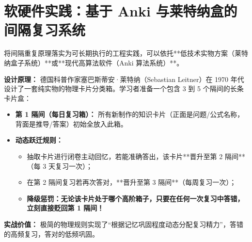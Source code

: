 \documentclass[12pt,a4paper,openany]{ctexbook}
\begin{document}
\section{软硬件实践：基于 Anki 与莱特纳盒的间隔复习系统}

将间隔重复原理落实为可长期执行的工程实践，可以依托**低技术实物方案（莱特纳盒子系统）**或**现代高算法软件（Anki 算法系统）**。

\begin{casebox}
\textbf{设计原理：} 
德国科普作家塞巴斯蒂安·莱特纳（Sebastian Leitner）在 1970 年代设计了一套纯实物的物理卡片分类箱。学习者准备一个包含 3 到 5 个隔间的长条卡片盒：
\begin{itemize}
    \item \textbf{第 1 隔间（每日复习箱）：} 所有新制作的知识卡片（正面是问题/公式名称，背面是推导/答案）初始全放入此箱。
    \item \textbf{动态跃迁规则：}
    \begin{itemize}
        \item 抽取卡片进行闭卷主动回忆，若能准确答出，该卡片**晋升至第 2 隔间**（每 3 天复习一次）；
        \item 在第 2 隔间复习若再次答对，**晋升至第 3 隔间**（每周复习一次）；
        \item \textbf{降级惩罚：无论该卡片处于哪个高阶箱子，只要在任何一次复习中答错，立刻直接贬回第 1 隔间！}
    \end{itemize}
\end{itemize}
\textbf{实战价值：} 极简的物理规则实现了“根据记忆巩固程度动态分配复习精力”，答错的高频复习，答对的低频巩固。
\end{casebox}
\end{document}

